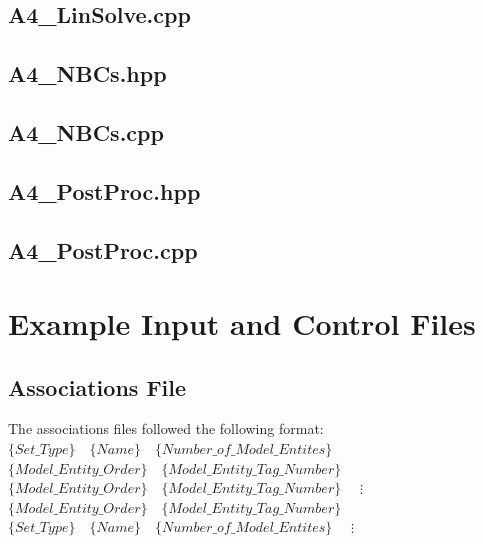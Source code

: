 \documentclass[a4paper, 12pt]{article}
\begin{document}
\newpage
\subsection{A4\_LinSolve.cpp} \label{subsec:LinSolve.cpp}


\newpage
\subsection{A4\_NBCs.hpp} \label{subsec:NBCs.hpp}


\newpage
\subsection{A4\_NBCs.cpp} \label{subsec:NBCs.cpp}


\newpage
\subsection{A4\_PostProc.hpp} \label{subsec:PostProc.hpp}


\newpage
\subsection{A4\_PostProc.cpp} \label{subsec:PostProc.cpp}


\newpage
\section{Example Input and Control Files}\label{sec:ExInput}

\subsection{Associations File} \label{subsec:ExAssoc}
The associations files followed the following format:
\newline
$\{Set\_Type\} \quad  \{Name\} \quad  \{Number\_of\_Model\_Entites\} \quad $
\newline
$\{Model\_Entity\_Order\} \quad  \{Model\_Entity\_Tag\_Number\} \quad $
\newline
$\{Model\_Entity\_Order\} \quad  \{Model\_Entity\_Tag\_Number\} \quad $
\newline
$\vdots$
\newline
$\{Model\_Entity\_Order\} \quad  \{Model\_Entity\_Tag\_Number\} \quad $
\newline
$\{Set\_Type\} \quad  \{Name\} \quad  \{Number\_of\_Model\_Entites\} \quad $
\newline
$\vdots$
\newline

\end{document}

